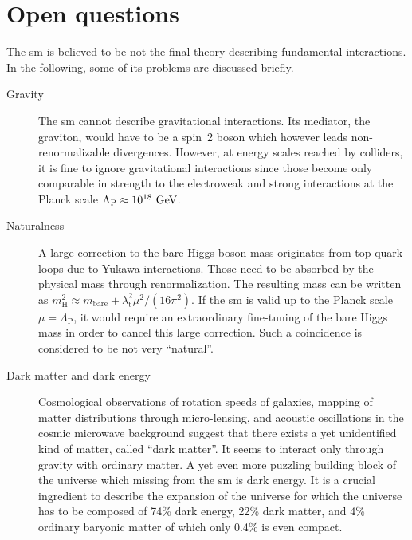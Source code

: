 \section{Open questions}

The \gls{sm} is believed to be not the final theory describing fundamental interactions. In the following, some of its problems are discussed briefly.

\begin{description}
\item[Gravity] The \gls{sm} cannot describe gravitational interactions. Its mediator, the graviton, would have to be a spin~2 boson which however leads non-renormalizable divergences. However, at energy scales reached by colliders, it is fine to ignore gravitational interactions since those become only comparable in strength to the electroweak and strong interactions at the Planck scale $\Lambda_\mathrm{P}\approx10^{18}~\mathrm{GeV}$. 
\item[Naturalness] A large correction to the bare Higgs boson mass originates from top quark loops due to Yukawa interactions. Those need to be absorbed by the physical mass through renormalization. The resulting mass can be written as $m^{2}_\mathrm{H}\approx m_\mathrm{bare}+\lambda_\mathrm{t}^{2}\mu^2/(16\pi^2)$. If the \gls{sm} is valid up to the Planck scale $\mu=\Lambda_\mathrm{P}$, it would require an extraordinary fine-tuning of the bare Higgs mass in order to cancel this large correction. Such a coincidence is considered to be not very ``natural''.
\item[Dark matter and dark energy] Cosmological observations of rotation speeds of galaxies, mapping of matter distributions through micro-lensing, and acoustic oscillations in the cosmic microwave background suggest that there exists a yet unidentified kind of matter, called ``dark matter''. It seems to interact only through gravity with ordinary matter. A yet even more puzzling building block of the universe which missing from the \gls{sm} is dark energy. It is a crucial ingredient to describe the expansion of the universe for which the universe has to be composed of 74\% dark energy, 22\% dark matter, and 4\% ordinary baryonic matter of which only 0.4\% is even compact.

\end{description}

